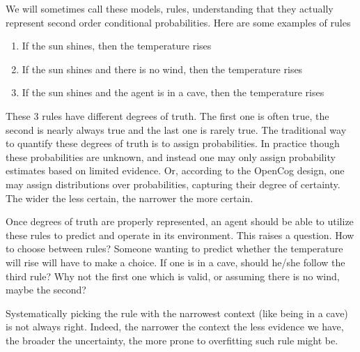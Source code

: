 \documentclass[runningheads]{llncs}
\begin{document}
We will sometimes call these models, rules, understanding that they
actually represent second order conditional probabilities. Here are
some examples of rules
\begin{enumerate}
\item If the sun shines, then the temperature rises
\item If the sun shines and there is no wind, then the temperature rises
\item If the sun shines and the agent is in a cave, then the
  temperature rises
\end{enumerate}

These 3 rules have different degrees of truth. The first one is often
true, the second is nearly always true and the last one is rarely
true. The traditional way to quantify these degrees of truth is to
assign probabilities. In practice though these probabilities are
unknown, and instead one may only assign probability estimates based
on limited evidence. Or, according to the OpenCog design, one may
assign distributions over probabilities, capturing their degree of
certainty. The wider the less certain, the narrower the more certain.





Once degrees of truth are properly represented, an agent should be
able to utilize these rules to predict and operate in its
environment. This raises a question. How to choose between rules?
Someone wanting to predict whether the temperature
will rise will have to make a choice. If one is in a cave, should
he/she follow the third rule? Why not the first one which is valid, or
assuming there is no wind, maybe the second?

Systematically picking the rule with the narrowest context (like being
in a cave) is not always right. Indeed, the narrower the context the
less evidence we have, the broader the uncertainty, the more prone to
overfitting such rule might be.
\end{document}
